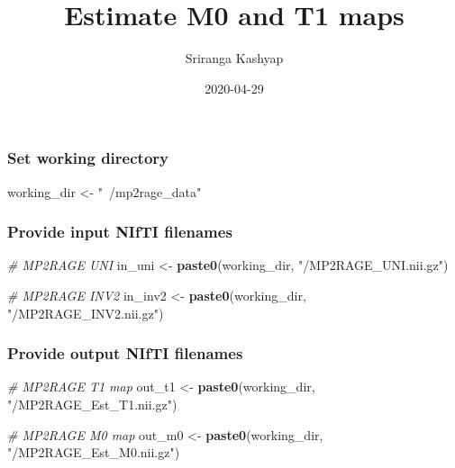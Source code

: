 \documentclass[]{article}
\title{Estimate M0 and T1 maps}
\author{Sriranga Kashyap}
\date{2020-04-29}
\newenvironment{Shaded}{\begin{snugshade}}{\end{snugshade}}
\newcommand{\CommentTok}[1]{\textcolor[rgb]{0.56,0.35,0.01}{\textit{#1}}}
\newcommand{\KeywordTok}[1]{\textcolor[rgb]{0.13,0.29,0.53}{\textbf{#1}}}
\newcommand{\NormalTok}[1]{#1}
\newcommand{\StringTok}[1]{\textcolor[rgb]{0.31,0.60,0.02}{#1}}
\begin{document}
\maketitle

\hypertarget{set-working-directory}{%
\subsubsection{Set working directory}\label{set-working-directory}}

\begin{Shaded}
\begin{Highlighting}[]
\NormalTok{working_dir <-}\StringTok{ "~/mp2rage_data"}
\end{Highlighting}
\end{Shaded}

\hypertarget{provide-input-nifti-filenames}{%
\subsubsection{Provide input NIfTI
filenames}\label{provide-input-nifti-filenames}}

\begin{Shaded}
\begin{Highlighting}[]
\CommentTok{# MP2RAGE UNI}
\NormalTok{in_uni <-}\StringTok{ }\KeywordTok{paste0}\NormalTok{(working_dir, }\StringTok{"/MP2RAGE_UNI.nii.gz"}\NormalTok{)}

\CommentTok{# MP2RAGE INV2}
\NormalTok{in_inv2 <-}\StringTok{ }\KeywordTok{paste0}\NormalTok{(working_dir, }\StringTok{"/MP2RAGE_INV2.nii.gz"}\NormalTok{)}
\end{Highlighting}
\end{Shaded}

\hypertarget{provide-output-nifti-filenames}{%
\subsubsection{Provide output NIfTI
filenames}\label{provide-output-nifti-filenames}}

\begin{Shaded}
\begin{Highlighting}[]
\CommentTok{# MP2RAGE T1 map}
\NormalTok{out_t1 <-}
\StringTok{  }\KeywordTok{paste0}\NormalTok{(working_dir, }\StringTok{"/MP2RAGE_Est_T1.nii.gz"}\NormalTok{)}

\CommentTok{# MP2RAGE M0 map}
\NormalTok{out_m0 <-}
\StringTok{  }\KeywordTok{paste0}\NormalTok{(working_dir, }\StringTok{"/MP2RAGE_Est_M0.nii.gz"}\NormalTok{)}
\end{Highlighting}
\end{Shaded}
\end{document}
